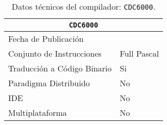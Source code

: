 \begin{table}[h]

\begin{center}

\begin{tabular}{|l|l|}\hline
\multicolumn{2}{|c|}{\texttt{CDC6000}}\\ 
\hline
\hline
Fecha de Publicación &  \\ \hline
Conjunto de Instrucciones & Full Pascal  \\ \hline
Traducción a Código Binario &  Si \\ \hline
Paradigma Distribuido & No  \\ \hline
IDE &  No \\ \hline
Multiplataforma & No \\ \hline
\end{tabular}

\caption{Datos técnicos del compilador: \texttt{CDC6000}.}

\end{center}

\end{table}